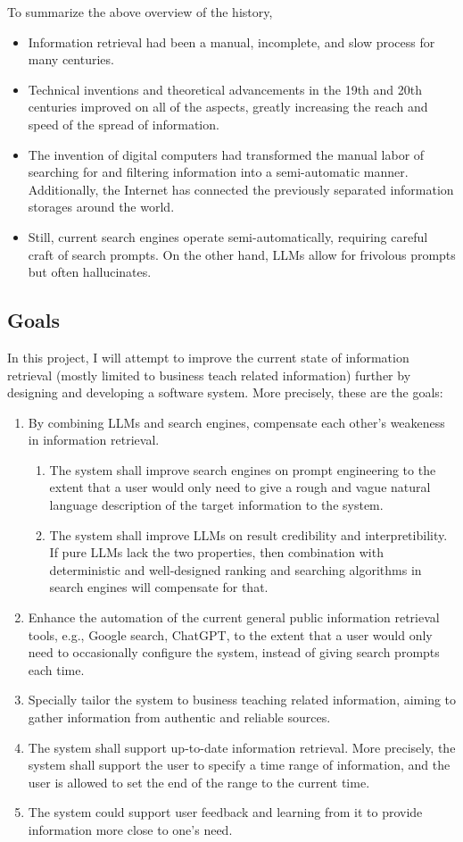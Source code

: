 \documentclass[final-report]{report-template}
\begin{document}
To summarize the above overview of the history,
\begin{itemize}
	\item Information retrieval had been a manual, incomplete, and slow process
		for many centuries.
	\item Technical inventions and theoretical advancements in the 19th and
		20th centuries improved on all of the aspects, greatly increasing the
		reach and speed of the spread of information.
	\item The invention of digital computers had transformed the manual labor
		of searching for and filtering information into a semi-automatic
		manner. Additionally, the Internet has connected the previously
		separated information storages around the world.
	\item Still, current search engines operate semi-automatically, requiring
		careful craft of search prompts. On the other hand, LLMs allow for
		frivolous prompts but often hallucinates.
\end{itemize}

\subsection{Goals}
In this project, I will attempt to improve the current state of information
retrieval (mostly limited to business teach related information) further by
designing and developing a software
system. More precisely, these are the goals:
\begin{enumerate}
	\item By combining LLMs and search engines, compensate each other's
		weakeness in information retrieval.
		\begin{enumerate}
		\item The system shall improve search engines on prompt engineering to
			the extent that a user would only need to give a rough and vague
			natural language description of the target information to the
			system.
		\item The system shall improve LLMs on result credibility and
			interpretibility. If pure LLMs lack the two properties, then
			combination with deterministic and well-designed ranking and
			searching algorithms in search engines will compensate for that.
		\end{enumerate}
	\item Enhance the automation of the current general public information
		retrieval tools, e.g., Google search, ChatGPT, to the extent that a
		user would only need to occasionally configure the system, instead of
		giving search prompts each time.
	\item Specially tailor the system to business teaching related information,
		aiming to gather information from authentic and reliable sources.
	\item The system shall support up-to-date information retrieval. More
		precisely, the system shall support the user to specify a time range of
		information, and the user is allowed to set the end of the range to the
		current time.
	\item The system could support user feedback and learning from it to
		provide information more close to one's need.
\end{enumerate}
\end{document}
